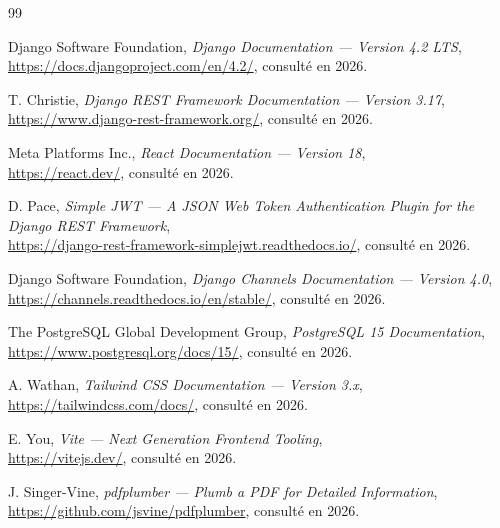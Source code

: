 
\begin{thebibliography}{99}

Django Software Foundation, \emph{Django Documentation --- Version 4.2 LTS},\\
\url{https://docs.djangoproject.com/en/4.2/}, consulté en 2026.

T. Christie, \emph{Django REST Framework Documentation --- Version 3.17},\\
\url{https://www.django-rest-framework.org/}, consulté en 2026.

Meta Platforms Inc., \emph{React Documentation --- Version 18},\\
\url{https://react.dev/}, consulté en 2026.

D. Pace, \emph{Simple JWT --- A JSON Web Token Authentication Plugin for the Django REST Framework},\\
\url{https://django-rest-framework-simplejwt.readthedocs.io/}, consulté en 2026.

Django Software Foundation, \emph{Django Channels Documentation --- Version 4.0},\\
\url{https://channels.readthedocs.io/en/stable/}, consulté en 2026.

The PostgreSQL Global Development Group, \emph{PostgreSQL 15 Documentation},\\
\url{https://www.postgresql.org/docs/15/}, consulté en 2026.

A. Wathan, \emph{Tailwind CSS Documentation --- Version 3.x},\\
\url{https://tailwindcss.com/docs/}, consulté en 2026.

E. You, \emph{Vite --- Next Generation Frontend Tooling},\\
\url{https://vitejs.dev/}, consulté en 2026.

J. Singer-Vine, \emph{pdfplumber --- Plumb a PDF for Detailed Information},\\
\url{https://github.com/jsvine/pdfplumber}, consulté en 2026.


\end{thebibliography}
